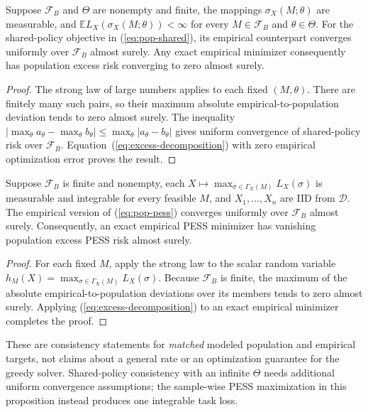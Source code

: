\documentclass[sigconf, nonacm]{acmart}
\begin{document}
\begin{proposition}
\label{prop:finite-policy-consistency}
Suppose $\mathcal F_B$ and $\Theta$ are nonempty and finite,
the mappings $\sigma_X(M;\theta)$ are measurable, and
$\mathbb E L_X(\sigma_X(M;\theta))<\infty$ for every
$M\in\mathcal F_B$ and $\theta\in\Theta$.
For the shared-policy objective in
(\ref{eq:pop-shared}), its empirical counterpart converges
uniformly over $\mathcal F_B$ almost surely.
Any exact empirical minimizer consequently has population
excess risk converging to zero almost surely.
\end{proposition}
\begin{proof}
The strong law of large numbers applies to each fixed
$(M,\theta)$. There are finitely many such pairs, so their
maximum absolute empirical-to-population deviation tends
to zero almost surely. The inequality
$|\max_\theta a_\theta-\max_\theta b_\theta|
\leq\max_\theta|a_\theta-b_\theta|$
gives uniform convergence of shared-policy risk over
$\mathcal F_B$. Equation~(\ref{eq:excess-decomposition})
with zero empirical optimization error proves the result.
\end{proof}
\begin{proposition}
\label{prop:pess-consistency}
Suppose $\mathcal F_B$ is finite and nonempty, each
$X\mapsto \max_{\sigma\in\Gamma_X(M)}L_X(\sigma)$
is measurable and integrable for every feasible $M$,
and $X_1,\dots,X_n$ are IID from $\mathcal D$.
The empirical version of (\ref{eq:pop-pess})
converges uniformly over $\mathcal F_B$ almost surely.
Consequently, an exact empirical PESS minimizer has
vanishing population excess PESS risk almost surely.
\end{proposition}
\begin{proof}
For each fixed $M$, apply the strong law to the scalar
random variable
$h_M(X)=\max_{\sigma\in\Gamma_X(M)}L_X(\sigma)$.
Because $\mathcal F_B$ is finite, the maximum of the
absolute empirical-to-population deviations over its
members tends to zero almost surely. Applying
(\ref{eq:excess-decomposition}) to an exact empirical
minimizer completes the proof.
\end{proof}
These are consistency statements for \emph{matched}
modeled population and empirical targets, not claims
about a general rate or an optimization guarantee for
the greedy solver. Shared-policy consistency with an
infinite $\Theta$ needs additional uniform convergence
assumptions; the sample-wise PESS maximization in this
proposition instead produces one integrable task loss.
\end{document}
